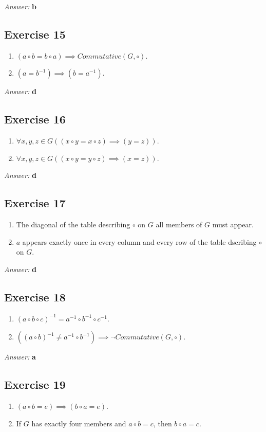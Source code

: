 \documentclass[11pt]{article}
\begin{document}
\emph{Answer:} \textbf{b}
\subsection{Exercise 15}
\label{sec-2-15}
\begin{enumerate}
\item $(a \circ b = b \circ a) \implies Commutative(G, \circ)$.
\item $(a = b^{-1}) \implies (b = a^{-1})$.
\end{enumerate}

\emph{Answer:} \textbf{d}
\subsection{Exercise 16}
\label{sec-2-16}
\begin{enumerate}
\item $\forall x, y, z \in G ((x \circ y = x \circ z) \implies (y = z))$.
\item $\forall x, y, z \in G ((x \circ y = y \circ z) \implies (x = z))$.
\end{enumerate}

\emph{Answer:} \textbf{d}
\subsection{Exercise 17}
\label{sec-2-17}
\begin{enumerate}
\item The diagonal of the table describing $\circ$ on $G$ all members of $G$ 
must appear.
\item $a$ appears exactly once in every column and every row of the table 
dscribing $\circ$ on $G$.
\end{enumerate}

\emph{Answer:} \textbf{d}
\subsection{Exercise 18}
\label{sec-2-18}
\begin{enumerate}
\item $(a \circ b \circ c)^{-1} = a^{-1} \circ b^{-1} \circ c^{-1}$.
\item $((a \circ b)^{-1} \neq a^{-1} \circ b^{-1}) \implies \lnot Commutative(G, \circ)$.
\end{enumerate}

\emph{Answer:} \textbf{a}
\subsection{Exercise 19}
\label{sec-2-19}
\begin{enumerate}
\item $(a \circ b = e) \implies (b \circ a = e)$.
\item If $G$ has exactly four members and $a \circ b = c$, then $b \circ a = c$.
\end{enumerate}
\end{document}

